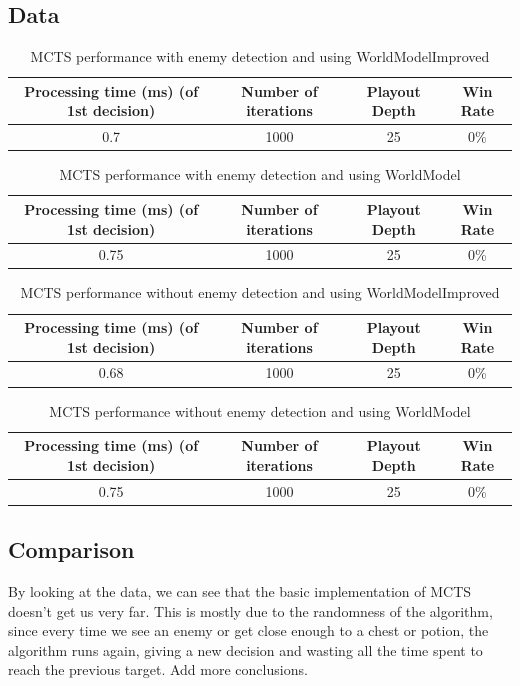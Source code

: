 \documentclass{article}
\begin{document}
  \subsection{Data}
  \begin{table}[h!]
    \centering
    \caption{MCTS performance with enemy detection and using WorldModelImproved}
    \label{tab:tableMCTS1}
    \begin{tabular}{c|c|c|c}
      \textbf{Processing time (ms) (of 1st decision)} & \textbf{Number of iterations} & \textbf{Playout Depth} & \textbf{Win Rate}\\
      \hline
      0.7 & 1000 & 25 & 0\%
    \end{tabular}
  \end{table}
  \begin{table}[h!]
    \centering
    \caption{MCTS performance with enemy detection and using WorldModel}
    \label{tab:tableMCTS2}
    \begin{tabular}{c|c|c|c}
      \textbf{Processing time (ms) (of 1st decision)} & \textbf{Number of iterations} & \textbf{Playout Depth} & \textbf{Win Rate}\\
      \hline
      0.75 & 1000 & 25 & 0\%
    \end{tabular}
  \end{table}
  \begin{table}[h!]
    \centering
    \caption{MCTS performance without enemy detection and using WorldModelImproved}
    \label{tab:tableMCTS3}
    \begin{tabular}{c|c|c|c}
      \textbf{Processing time (ms) (of 1st decision)} & \textbf{Number of iterations} & \textbf{Playout Depth} & \textbf{Win Rate}\\
      \hline
      0.68 & 1000 & 25 & 0\%
    \end{tabular}
  \end{table}
  \begin{table}[h!]
    \centering
    \caption{MCTS performance without enemy detection and using WorldModel}
    \label{tab:tableMCTS4}
    \begin{tabular}{c|c|c|c}
      \textbf{Processing time (ms) (of 1st decision)} & \textbf{Number of iterations} & \textbf{Playout Depth} & \textbf{Win Rate}\\
      \hline
      0.75 & 1000 & 25 & 0\%
    \end{tabular}
  \end{table}

  \subsection{Comparison}
  By looking at the data, we can see that the basic implementation of MCTS doesn't get us very far. This is mostly due to the randomness of the algorithm, 
  since every time we see an enemy or get close enough to a chest or potion, the algorithm runs again, giving a new decision and wasting all 
  the time spent to reach the previous target.
  Add more conclusions.\\
\end{document}

